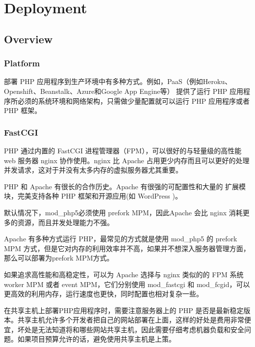 \part{Deployment}



\chapter{Overview}



\section{Platform}


部署 PHP 应用程序到生产环境中有多种方式。例如，PaaS（例如Heroku、Openshift、Beanstalk、Azure和Google App Engine等） 提供了运行 PHP 应用程序所必须的系统环境和网络架构，只需做少量配置就可以运行 PHP 应用程序或者 PHP 框架。






\section{FastCGI}


PHP 通过内置的 FastCGI 进程管理器（FPM），可以很好的与轻量级的高性能 web 服务器 nginx 协作使用。nginx 比 Apache 占用更少内存而且可以更好的处理并发请求，这对于并没有太多内存的虚拟服务器尤其重要。

PHP 和 Apache 有很长的合作历史。Apache 有很强的可配置性和大量的 扩展模块，完美支持各种 PHP 框架和开源应用(如 WordPress )。

默认情况下，mod\_php5必须使用 prefork MPM，因此Apache 会比 nginx 消耗更多的资源，而且并发处理能力不强。

Apache 有多种方式运行 PHP，最常见的方式就是使用 mod\_php5 的 prefork MPM 方式，但是它对内存的利用效率并不高，如果并不想深入服务器管理方面，那么可以部署为prefork MPM方式。

如果追求高性能和高稳定性，可以为 Apache 选择与 nginx 类似的的 FPM 系统 worker MPM 或者 event MPM，它们分别使用 mod\_fastcgi 和 mod\_fcgid，可以更高效的利用内存，运行速度也更快，同时配置也相对复杂一些。

在共享主机上部署PHP应用程序时，需要注意服务器上的 PHP 是否是最新稳定版本。共享主机允许多个开发者把自己的网站部署在上面，这样的好处是费用非常便宜，坏处是无法知道将和哪些网站共享主机，因此需要仔细考虑机器负载和安全问题。如果项目预算允许的话，避免使用共享主机是上策。

